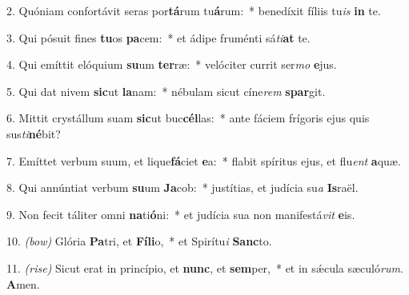 2. Quóniam confortávit seras por\textbf{tá}rum tu\textbf{á}rum:~* benedíxit fíliis tu\textit{is} \textbf{in} te.

3. Qui pósuit fines \textbf{tu}os \textbf{pa}cem:~* et ádipe fruménti sá\textit{ti}\textbf{at} te.

4. Qui emíttit elóquium \textbf{su}um \textbf{ter}ræ:~* velóciter currit ser\textit{mo} \textbf{e}jus.

5. Qui dat nivem \textbf{sic}ut \textbf{la}nam:~* nébulam sicut cíne\textit{rem} \textbf{spar}git.

6. Mittit crystállum suam \textbf{sic}ut buc\textbf{cél}las:~* ante fáciem frígoris ejus quis sus\textit{ti}\textbf{né}bit?

7. Emíttet verbum suum, et lique\textbf{fá}ciet \textbf{e}a:~* flabit spíritus ejus, et flu\textit{ent} \textbf{a}quæ.

8. Qui annúntiat verbum \textbf{su}um \textbf{Ja}cob:~* justítias, et judícia su\textit{a} \textbf{Is}raël.

9. Non fecit táliter omni \textbf{na}ti\textbf{ó}ni:~* et judícia sua non manifestá\textit{vit} \textbf{e}is.

10. {\color{red}\textit{(bow)}} Glória \textbf{Pa}tri, et \textbf{Fí}\textbf{li}o,~* et Spirítu\textit{i} \textbf{Sanc}to.

11. {\color{red}\textit{(rise)}} Sicut erat in princípio, et \textbf{nunc}, et \textbf{sem}per,~* et in s\'{\ae}cula sæculó\textit{rum}. \textbf{A}men.

